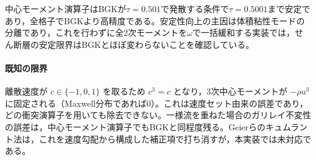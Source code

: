 中心モーメント演算子はBGKが\(\tau=0.501\)で発散する条件で\(\tau=0.5001\)まで安定であり，全格子でBGKより高精度である。安定性向上の主因は体積粘性モードの分離であり，これを行わずに全2次モーメントを\(\omega\)で一括緩和する実装では，せん断層の安定限界はBGKとほぼ変わらないことを確認している。

\paragraph{既知の限界}
離散速度が \(c\in\{-1,0,1\}\) を取るため \(c^3=c\) となり，3次中心モーメントが \(-\rho u^3\) に固定される（Maxwell分布であれば0）。これは速度セット由来の誤差であり，どの衝突演算子を用いても除去できない。一様流を重ねた場合のガリレイ不変性の誤差は，中心モーメント演算子でもBGKと同程度残る。Geierらのキュムラント法\cite{geier2015cumulant}は，これを速度勾配から構成した補正項で打ち消すが，本実装では未対応である。
